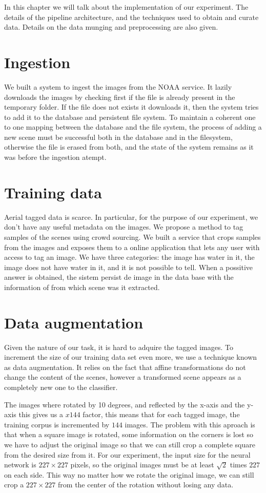 
In this chapter we will talk about the implementation of our experiment. The details of the pipeline architecture, and the techniques used to obtain and curate data. Details on the data munging and preprocessing are also given.

\section{Ingestion}

We built a system to ingest the images from the NOAA service. It lazily downloads the images by checking first if the file is already present in the temporary folder. If the file does not exists it downloads it, then the system tries to add it to the database and persistent file system. To maintain a coherent one to one mapping between the database and the file system, the process of adding a new scene must be successful both in the database and in the filesystem, otherwise the file is erased from both, and the state of the system remains as it was before the ingestion atempt.

\section{Training data}

Aerial tagged data is scarce. In particular, for the purpose of our experiment, we don't have any useful metadata on the images. We propose a method to tag samples of the scenes using crowd sourcing. We built a service that crops samples from the images and exposes them to a online application that lets any user with access to tag an image. We have three categories: the image has water in it, the image does not have water in it, and it is not possible to tell. When a possitive answer is obtained, the sistem persist de image in the data base with the information of from which scene was it extracted.

\section{Data augmentation}

Given the nature of our task, it is hard to adquire the tagged images. To increment the size of our training data set even more, we use a technique known as data augmentation. It relies on the fact that affine transformations do not change the content of the scenes, however a transformed scene appears as a completely new one to the classifier. 

The images where rotated by 10 degrees, and reflected by the x-axis and the y-axis this gives us a $x144$ factor, this means that for each tagged image, the training corpus is incremented by $144$ images. The problem with this aproach is that when a square image is rotated, some information on the corners is lost so we have to adjust the original image so that we can still crop a complete square from the desired size from it. For our experiment, the input size for the neural network is $227\times 227$ pixels, so the original images must be at least $\sqrt{2}$ times $227$ on each side. This way no matter how we rotate the original image, we can still crop a $227\times 227$ from the center of the rotation without losing any data.